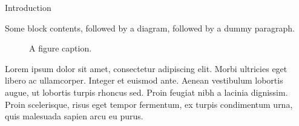 \begin{block}{Introduction}

Some block contents, followed by a diagram, followed by a dummy paragraph.

\begin{figure}
  \centering
  \caption{A figure caption.}
\end{figure}

Lorem ipsum dolor sit amet, consectetur adipiscing elit. Morbi ultricies
eget libero ac ullamcorper. Integer et euismod ante. Aenean vestibulum
lobortis augue, ut lobortis turpis rhoncus sed. Proin feugiat nibh a
lacinia dignissim. Proin scelerisque, risus eget tempor fermentum, ex
turpis condimentum urna, quis malesuada sapien arcu eu purus.

\end{block}
